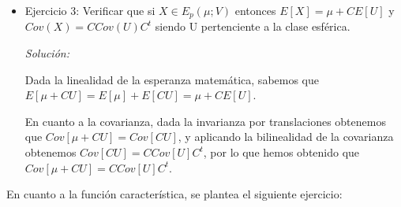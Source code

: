 \documentclass{article}
\theoremstyle{theorem-style}  %
\theoremstyle{definition}
\theoremstyle{example-style}
\begin{document}
\begin{itemize}
			\item Ejercicio 3: Verificar que si $X \in E_p(\mu; V)$  entonces $E[X] = \mu + CE[U]$ y $Cov(X)= C Cov(U)C^t$ siendo U pertenciente a la clase esférica.
			
			\textit{Solución:}
			
			Dada la linealidad de la esperanza matemática, sabemos que $E[\mu + CU] = E[\mu] + E[CU] = \mu + CE[U]$.
			
			En cuanto a la covarianza, dada la invarianza por translaciones obtenemos que $Cov[\mu + CU] = Cov[CU]$, y aplicando la bilinealidad de la covarianza obtenemos $Cov[CU] = C Cov[U]C^t$, por lo que hemos obtenido que $Cov[\mu + CU] = C Cov[U] C^t$.

		\end{itemize}
		
		En cuanto a la función característica, se plantea el siguiente ejercicio:
		
\end{document}
